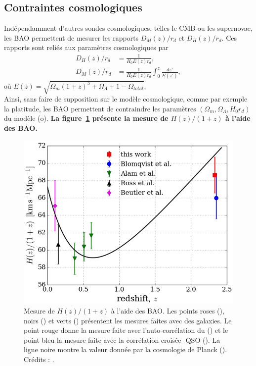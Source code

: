 \documentclass[11pt, twoside, a4paper, openright]{report}
\begin{document}
\subsection{Contraintes cosmologiques}
Indépendamment d'autres sondes cosmologiques, telles le CMB ou les supernovae, les BAO permettent de mesurer les rapports $D_M(z) / r_d$ et $D_H(z) / r_d$. Ces rapports sont reliés aux paramètres cosmologiques par
\begin{align}
  D_H(z) / r_d &= \frac{1}{H_0 E(z) r_d}, \\
  D_M(z) / r_d &= \frac{1}{H_0 E(z) r_d} \int_0^z \frac{dz'}{E(z')},
\end{align}
où $E(z) = \sqrt{\Omega_m (1+z)^3 + \Omega_{\Lambda} + 1 - \Omega_{total}}$. \\
Ainsi, sans faire de supposition sur le modèle cosmologique, comme par exemple la platitude, les BAO permettent de contraindre les paramètres $(\Omega_{m} , \Omega_{\Lambda} , H_0 r_d)$ du modèle (o)\lcdm{}.
\textbf{La figure~\ref{fig:h_vs_z} présente la mesure de $H(z) / (1+z)$ à l'aide des BAO.}
\begin{figure}
  \centering
  \includegraphics[scale=0.35]{h_vs_z}
  \caption{Mesure de $H(z) / (1+z)$ à l'aide des BAO. Les points roses (\cite{Beutler2011}), noirs (\cite{Ross2014a}) et verts (\cite{Alam2016}) présentent les mesures faites avec des galaxies. Le point rouge donne la mesure faite avec l'auto-corrélation du \lya{}(\cite{Agathe2019a}) et le point bleu la mesure faite avec la corrélation croisée \lya{}-QSO (\cite{Blomqvist2019a}). La ligne noire montre la valeur donnée par la cosmologie de Planck (\cite{planck_collaboration_planck_2015}). Crédits : \cite{Agathe2019a}.}
  \label{fig:h_vs_z}
\end{figure}
\end{document}

